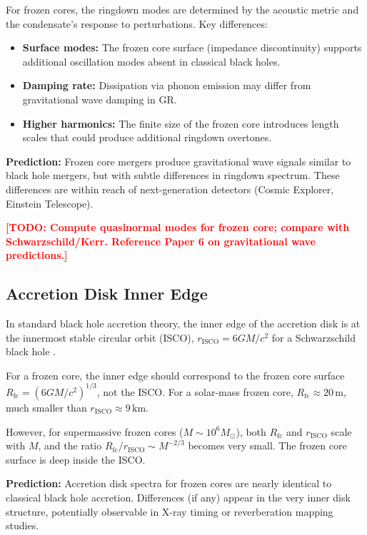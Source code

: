 \documentclass[12pt,a4paper]{article}
\newcommand{\TODO}[1]{\textcolor{red}{\textbf{[TODO: #1]}}}
\newcommand{\Rfc}{R_\text{fc}}
\theoremstyle{definition}
\begin{document}
For frozen cores, the ringdown modes are determined by the acoustic metric and the condensate's response to perturbations. Key differences:

\begin{itemize}
  \item \textbf{Surface modes:} The frozen core surface (impedance discontinuity) supports additional oscillation modes absent in classical black holes.
  \item \textbf{Damping rate:} Dissipation via phonon emission may differ from gravitational wave damping in GR.
  \item \textbf{Higher harmonics:} The finite size of the frozen core introduces length scales that could produce additional ringdown overtones.
\end{itemize}

\textbf{Prediction:} Frozen core mergers produce gravitational wave signals similar to black hole mergers, but with subtle differences in ringdown spectrum. These differences are within reach of next-generation detectors (Cosmic Explorer, Einstein Telescope).

\TODO{Compute quasinormal modes for frozen core; compare with Schwarzschild/Kerr. Reference Paper 6 on gravitational wave predictions.}

\subsection{Accretion Disk Inner Edge}
\label{subsec:accretion_disk}

In standard black hole accretion theory, the inner edge of the accretion disk is at the innermost stable circular orbit (ISCO), $r_\text{ISCO} = 6GM/c^2$ for a Schwarzschild black hole \cite{Shakura1973}.

For a frozen core, the inner edge should correspond to the frozen core surface $\Rfc = (6GM/c^2)^{1/3}$, not the ISCO. For a solar-mass frozen core, $\Rfc \approx 20\,\text{m}$, much smaller than $r_\text{ISCO} \approx 9\,\text{km}$.

However, for supermassive frozen cores ($M \sim 10^6 M_\odot$), both $\Rfc$ and $r_\text{ISCO}$ scale with $M$, and the ratio $\Rfc/r_\text{ISCO} \sim M^{-2/3}$ becomes very small. The frozen core surface is deep inside the ISCO.

\textbf{Prediction:} Accretion disk spectra for frozen cores are nearly identical to classical black hole accretion. Differences (if any) appear in the very inner disk structure, potentially observable in X-ray timing or reverberation mapping studies.
\end{document}
